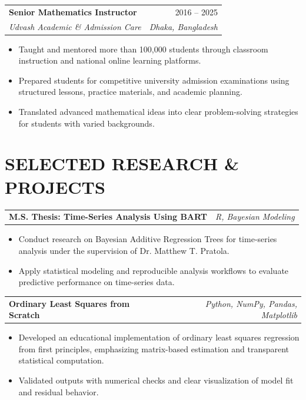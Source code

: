 \documentclass[10pt,letterpaper]{article}
\makeatletter
\newcommand{\resumeEntry}[4]{%
	\begin{tabularx}{\textwidth}{@{}Xr@{}}
		\textbf{#1} & #2 \\
		\textit{#3} & \textit{#4}
	\end{tabularx}%
}
\newcommand{\projectEntry}[2]{%
	\begin{tabularx}{\textwidth}{@{}Xr@{}}
		\textbf{#1} & \textit{#2}
	\end{tabularx}%
}
\newenvironment{resumeItems}{%
	\begin{itemize}[
		label=\textbullet,
		leftmargin=14pt,
		labelsep=5pt,
		itemsep=0.5pt,
		topsep=1.0pt,
		parsep=0pt,
		partopsep=0pt
	]
}{%
	\end{itemize}
}
\makeatother
\begin{document}
\vspace{1.3pt}

\resumeEntry
	{Senior Mathematics Instructor}
	{2016 -- 2025}
	{Udvash Academic \& Admission Care}
	{Dhaka, Bangladesh}

\begin{resumeItems}
	\item Taught and mentored more than 100,000 students through classroom instruction and national online learning platforms.

	\item Prepared students for competitive university admission examinations using structured lessons, practice materials, and academic planning.

	\item Translated advanced mathematical ideas into clear problem-solving strategies for students with varied backgrounds.
\end{resumeItems}

\section*{SELECTED RESEARCH \& PROJECTS}

\projectEntry
	{M.S. Thesis: Time-Series Analysis Using BART}
	{R, Bayesian Modeling}

\begin{resumeItems}
	\item Conduct research on Bayesian Additive Regression Trees for time-series analysis under the supervision of Dr. Matthew T. Pratola.

	\item Apply statistical modeling and reproducible analysis workflows to evaluate predictive performance on time-series data.
\end{resumeItems}

\vspace{0.7pt}

\projectEntry
	{Ordinary Least Squares from Scratch}
	{Python, NumPy, Pandas, Matplotlib}

\begin{resumeItems}
	\item Developed an educational implementation of ordinary least squares regression from first principles, emphasizing matrix-based estimation and transparent statistical computation.

	\item Validated outputs with numerical checks and clear visualization of model fit and residual behavior.
\end{resumeItems}
\end{document}
